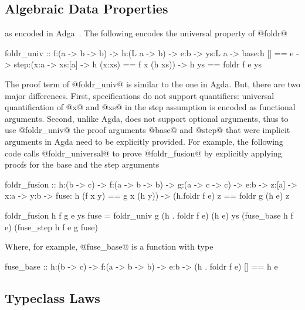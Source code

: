 \subsection{Algebraic Data Properties}
\label{subsec:fold}

as encoded in Adga~\citep{agdaequational}.
%
The following encodes the universal property of @foldr@
%
\begin{code}
  foldr_univ :: f:(a -> b -> b)
             -> h:(L a -> b)
             -> e:b
             -> ys:L a
             -> base:{h [] == e }
             -> step:(x:a -> xs:[a] -> {h (x:xs) == f x (h xs)})
             -> {h ys == foldr f e ys}
\end{code}
%
The \toolname proof term of @foldr_univ@
is similar to the one in Agda.
But, there are two major differences.
%
First, specifications do not support
quantifiers: universal quantification
of @x@ and @xs@ in the step assumption
is encoded as functional arguments.
%
Second, unlike Agda, \toolname does not
support optional arguments, thus to use
@foldr_univ@ the proof arguments @base@
and @step@ that were implicit arguments
in Agda need to be explicitly provided.
%
For example, the following code calls
@foldr_universal@ to prove @foldr_fusion@
by explicitly applying proofs for the
base and the step arguments
%
\begin{code}
  foldr_fusion :: h:(b -> c)
               -> f:(a -> b -> b)
               -> g:(a -> c -> c)
               -> e:b
               -> z:[a]
               -> x:a -> y:b
               -> fuse: {h (f x y) == g x (h y)})
               -> {(h.foldr f e) z == foldr g (h e) z}

  foldr_fusion h f g e ys fuse = foldr_univ g (h . foldr f e) (h e) ys
                                   (fuse_base h f e)
                                   (fuse_step h f e g fuse)
\end{code}
%
Where, for example, @fuse_base@ is a function with type
%
\begin{code}
  fuse_base :: h:(b -> c) -> f:(a -> b -> b) -> e:b -> {(h . foldr f e) [] == h e}
\end{code}



\subsection{Typeclass Laws}

